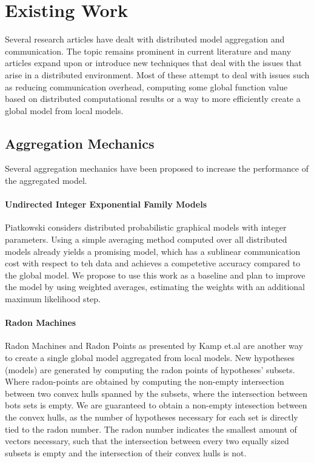    \section{Existing Work}
    \label{sec:ew}
    Several research articles have dealt with distributed model aggregation and communication. 
    The topic remains prominent in current literature and many articles expand upon or introduce new techniques that deal with the issues that arise in a distributed environment.
    Most of these attempt to deal with issues such as reducing communication overhead, computing some global function value based on distributed computational results or a way to more efficiently create a global model from local models.

    \subsection{Aggregation Mechanics}

    Several aggregation mechanics have been proposed to increase the performance of the aggregated model. 

    \paragraph{Undirected Integer Exponential Family Models}
    Piatkowski \cite{piatkowskidistributed} considers distributed probabilistic graphical models with integer parameters. 
    Using a simple averaging method computed over all distributed models already yields a promising model, which has a sublinear communication cost with respect to teh data and achieves a competetive accuracy compared to the global model.
    We propose to use this work as a baseline and plan to improve the model by using weighted averages, estimating the weights with an additional maximum likelihood step.
    
    \paragraph{Radon Machines}
    Radon Machines and Radon Points as presented by Kamp et.al \cite{kamp2017effective} are another way to create a single global model aggregated from local models. New hypotheses (models) are generated by computing the radon points of hypotheses' subsets. Where radon-points are obtained by computing the non-empty intersection between two convex hulls spanned by the subsets, where the intersection between bots sets is empty.
    We are guaranteed to obtain a non-empty intesection between the convex hulls, as the number of hypotheses necessary for each set is directly tied to the radon number. 
    The radon number indicates the smallest amount of vectors necessary, such that the intersection between every two equally sized subsets is empty and the intersection of their convex hulls is not.
    

